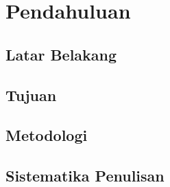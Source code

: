 \chapter{Pendahuluan}

\section{Latar Belakang}
\blindtext

\section{Tujuan}
\blindtext

\section{Metodologi}
\blindtext

\section{Sistematika Penulisan}
\blindtext
